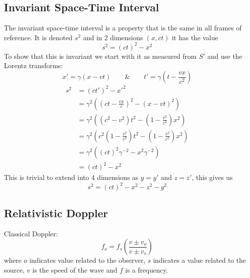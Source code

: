 \documentclass{article}
\begin{document}
    \subsection{Invariant Space-Time Interval}
    The invariant space-time interval is a property that is the same in all frames of reference.
    It is denoted \(s^2\) and in 2 dimensions \((x, ct)\) it has the value
    \[s^2 = (ct)^2 - x^2\]
    To show that this is invariant we start with it as measured from \(S'\) and use the Lorentz transforms:
    \[x' = \gamma(x - vt)\qquad \& \qquad t' = \gamma\left(t-\frac{vx}{c^2}\right)\]
    \begin{align*}
        s^2 &= (ct')^2 - x'^2\\
        &= \gamma^2\left(\left(ct-\frac{vx}{c}\right)^2 - (x-vt)^2\right)\\
        &= \gamma^2\left((c^2 - v^2)t^2 - \left(1-\frac{v^2}{c^2}\right)x^2\right)\\
        &= \gamma^2\left(c^2\left(1 - \frac{v^2}{c^2}\right)t^2 - \left(1-\frac{v^2}{c^2}\right)x^2\right)\\
        &= \gamma^2((ct)^2\gamma^{-2} - x^2\gamma^{-2})\\
        &= (ct)^2 - x^2
    \end{align*}
    This is trivial to extend into 4 dimensions as \(y=y'\) and \(z=z'\), this gives us
    \[s^2 = (ct)^2 - x^2 - z^2 - y^2\]
    
    \subsection{Relativistic Doppler}
    Classical Doppler:
    \[f_o = f_s\left(\frac{v\pm v_o}{v\pm v_s}\right)\]
    where \(o\) indicates value related to the observer, \(s\) indicates a value related to the source, \(v\) is the speed of the wave and \(f\) is a frequency.
    
\end{document}
